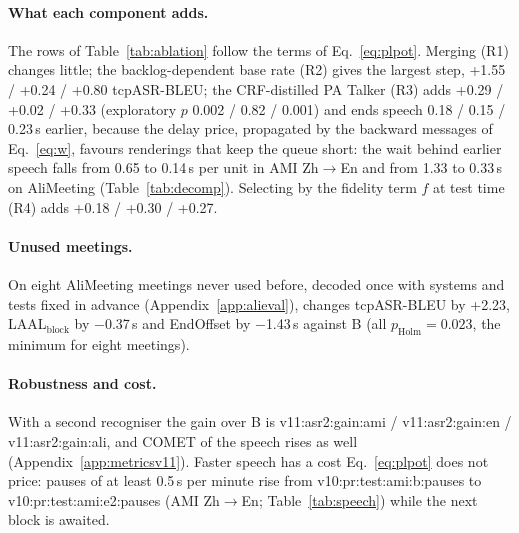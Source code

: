 \paragraph{What each component adds.} The rows of Table~\ref{tab:ablation} follow the terms of Eq.~\eqref{eq:plpot}.
Merging (R1) changes little; the backlog-dependent base rate (R2) gives the largest step, +1.55 / +0.24 / +0.80
tcpASR-BLEU; the CRF-distilled PA Talker (R3) adds +0.29 / +0.02 / +0.33 (exploratory $p$ 0.002 / 0.82 / 0.001) and
ends speech 0.18 / 0.15 / 0.23\,s earlier, because the delay price, propagated by the backward messages of
Eq.~\eqref{eq:w}, favours renderings that keep the queue short: the wait behind earlier speech falls from 0.65 to
0.14\,s per unit in AMI Zh$\rightarrow$En and from 1.33 to 0.33\,s on AliMeeting (Table~\ref{tab:decomp}). Selecting
by the fidelity term $f$ at test time (R4) adds +0.18 / +0.30 / +0.27.

\ifAliEval
\paragraph{Unused meetings.}
\label{sec:res-alieval}
On eight AliMeeting meetings never used before, decoded once with systems and tests fixed in advance
(Appendix~\ref{app:alieval}), \sys{} changes tcpASR-BLEU by +2.23, LAAL$_\text{block}$ by $-$0.37\,s and EndOffset by
$-$1.43\,s against B (all $p_\text{Holm}=0.023$, the minimum for eight meetings).
\fi

\paragraph{Robustness and cost.}\ifMetricsV{} With a second recogniser the gain over B is
\num{v11:asr2:gain:ami} / \num{v11:asr2:gain:en} / \num{v11:asr2:gain:ali}, and COMET of the speech rises as well
(Appendix~\ref{app:metricsv11}).\fi{} Faster speech has a cost Eq.~\eqref{eq:plpot} does not price: pauses of at least
0.5\,s per minute rise from \num{v10:pr:test:ami:b:pauses} to \num{v10:pr:test:ami:e2:pauses} (AMI
Zh$\rightarrow$En; Table~\ref{tab:speech}) while the next block is awaited.
